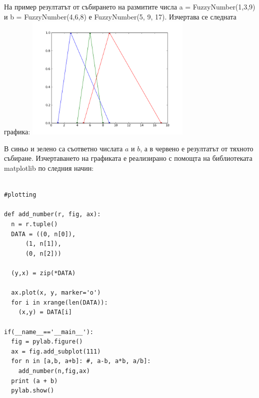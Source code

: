 \documentclass[a4paper,12pt]{article}
\begin{document}
На пример резултатът от събирането на размитите числа a = FuzzyNumber(1,3,9) и b = FuzzyNumber(4,6,8) е FuzzyNumber(5, 9, 17). Изчертава се следната графика: \newline
\includegraphics[width = 300px]{fuzzy_graphic.png}

В синьо и зелено са съответно числата $a$ и $b$, а в червено е резултатът от тяхното събиране.
Изчертаването на графиката е реализирано с помощта на библиотеката matplotlib по следния начин:

\begin{verbatim}

#plotting

def add_number(r, fig, ax):
  n = r.tuple()
  DATA = ((0, n[0]),
      (1, n[1]),
      (0, n[2]))

  (y,x) = zip(*DATA)

  ax.plot(x, y, marker='o')
  for i in xrange(len(DATA)):
    (x,y) = DATA[i]

if(__name__=='__main__'):
  fig = pylab.figure()
  ax = fig.add_subplot(111)
  for n in [a,b, a+b]: #, a-b, a*b, a/b]:
    add_number(n,fig,ax)
  print (a + b)
  pylab.show()

\end{verbatim}
\end{document}
